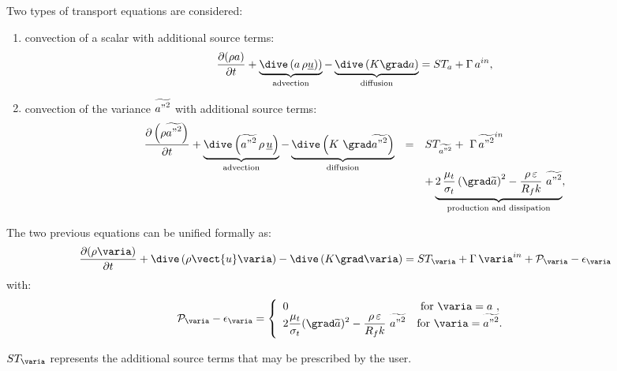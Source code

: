 Two types of transport equations are considered: 
%
\begin{enumerate}[ label=\roman{*}/, ref=(\roman{*})]
\item convection of a scalar with additional source terms:
\begin{equation}
\frac{\partial (\rho a)}{\partial t} +
\underbrace{
\dive \left( a \, \rho \underline{u})
\right)
}_{\text{advection}}
-\underbrace{
\dive \left( K\grad a \right) 
}_{
\text{diffusion}} = ST_{a}+\Gamma \,a^{in},
\end{equation}

\item convection of the variance $\widetilde{{a"}^{2}}$ with
additional source terms:
\begin{equation}
\begin{array}{rcl}
\displaystyle\frac{\partial \left(\rho \widetilde{{a"}^{2}}\right)}{\partial t}+
\underbrace{
\dive \left( \widetilde{{a"}^{2}} \, \rho \,\underline{u} \right)
}_{\text{advection}}
-\underbrace{
\dive \left( K\ \grad\widetilde{{a"}^{2}} \right)
}_{\text{diffusion}}
&=&ST_{\widetilde{{a"}^{2}}}+ \ \Gamma \, \widetilde{{a"}^{2}}^{in} 
\\
& &\displaystyle +
\underbrace{
2\,\frac{\mu _{t}}{\sigma _{t}} \left( \grad\widetilde{a} \right)^{2}-
\frac{\rho \,\varepsilon }{R_{f}k}\ \widetilde{{a"}^{2}}
}_{\text{production and dissipation}} ,
\end{array}%
\end{equation}%
\end{enumerate}

The two previous equations can be unified formally as:
\begin{equation}\label{eq:base_introd_depart}
\frac{\partial (\rho \varia)}{\partial t}+\dive \left( \rho \vect{u} \varia \right)
-\dive \left( K\grad \varia \right) = ST_{\varia}+\Gamma \,\varia^{in}+ \mathcal{P}_\varia - \mathcal{\epsilon}_\varia  
\end{equation}%
with:
\begin{equation}
 \mathcal{P}_\varia - \mathcal{\epsilon}_\varia  = 
\left\{
\begin{array}{ll}
 0 & \text{ for $\varia=a$ }, \\
 2 \displaystyle \frac{\mu_t}{\sigma_t}(\grad \widetilde{a})^2 - \displaystyle
\frac{\rho\,\varepsilon}{R_f k}\ \widetilde{{a"}^2} & \text{for
$\varia=\widetilde{{a"}^2}$. }
\end{array}%
\right.
\end{equation}

$ST_\varia$ represents the additional source terms that may be prescribed by the
user.
